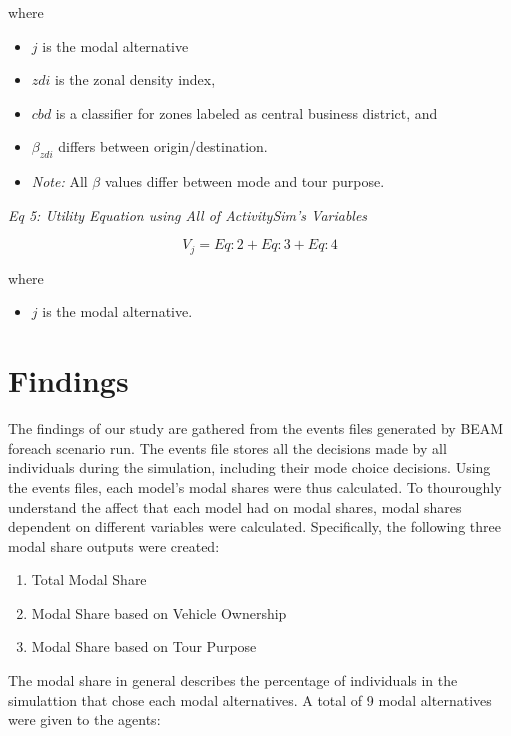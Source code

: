 \documentclass[3p, authoryear]{elsarticle} %
\providecommand{\tightlist}{%
  \setlength{\itemsep}{0pt}\setlength{\parskip}{0pt}}
\begin{document}
where

\begin{itemize}
\tightlist
\item
  \(j\) is the modal alternative
\item
  \(zdi\) is the zonal density index,
\item
  \(cbd\) is a classifier for zones labeled as central business district, and
\item
  \(\beta_{zdi}\) differs between origin/destination.
\item
  \emph{Note:} All \(\beta\) values differ between mode and tour purpose.
\end{itemize}

\emph{Eq 5: Utility Equation using All of ActivitySim's Variables}

\begin{equation}  
  V_j = Eq:2 + Eq:3 + Eq:4 \label{eq:label5}
\end{equation}

where

\begin{itemize}
\tightlist
\item
  \(j\) is the modal alternative.
\end{itemize}

\hypertarget{findings}{%
\section{Findings}\label{findings}}

The findings of our study are gathered from the events files generated by BEAM foreach scenario run. The events file stores all the decisions made by all individuals during the simulation, including their mode choice decisions. Using the events files, each model's modal shares were thus calculated. To thouroughly understand the affect that each model had on modal shares, modal shares dependent on different variables were calculated. Specifically, the following three modal share outputs were created:

\begin{enumerate}
\def\labelenumi{\arabic{enumi}.}
\tightlist
\item
  Total Modal Share
\item
  Modal Share based on Vehicle Ownership
\item
  Modal Share based on Tour Purpose
\end{enumerate}

The modal share in general describes the percentage of individuals in the simulattion that chose each modal alternatives. A total of 9 modal alternatives were given to the agents:
\end{document}
